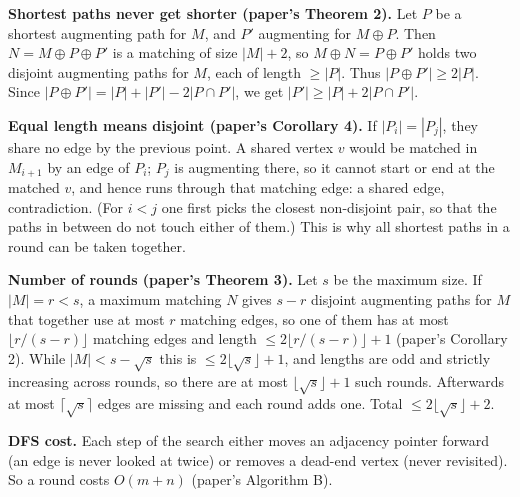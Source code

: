 \documentclass[11pt,a4paper]{article}
\begin{document}
\textbf{Shortest paths never get shorter (paper's Theorem 2).} Let $P$ be a shortest augmenting path for $M$, and $P'$ augmenting for $M\oplus P$. Then $N=M\oplus P\oplus P'$ is a matching of size $|M|+2$, so $M\oplus N=P\oplus P'$ holds two disjoint augmenting paths for $M$, each of length $\ge|P|$. Thus $|P\oplus P'|\ge2|P|$. Since $|P\oplus P'|=|P|+|P'|-2|P\cap P'|$, we get $|P'|\ge|P|+2|P\cap P'|$.

\textbf{Equal length means disjoint (paper's Corollary 4).} If $|P_i|=|P_j|$, they share no edge by the previous point. A shared vertex $v$ would be matched in $M_{i+1}$ by an edge of $P_i$; $P_j$ is augmenting there, so it cannot start or end at the matched $v$, and hence runs through that matching edge: a shared edge, contradiction. (For $i<j$ one first picks the closest non-disjoint pair, so that the paths in between do not touch either of them.) This is why all shortest paths in a round can be taken together.

\textbf{Number of rounds (paper's Theorem 3).} Let $s$ be the maximum size. If $|M|=r<s$, a maximum matching $N$ gives $s-r$ disjoint augmenting paths for $M$ that together use at most $r$ matching edges, so one of them has at most $\lfloor r/(s-r)\rfloor$ matching edges and length $\le2\lfloor r/(s-r)\rfloor+1$ (paper's Corollary 2). While $|M|<s-\sqrt s$ this is $\le2\lfloor\sqrt s\rfloor+1$, and lengths are odd and strictly increasing across rounds, so there are at most $\lfloor\sqrt s\rfloor+1$ such rounds. Afterwards at most $\lceil\sqrt s\rceil$ edges are missing and each round adds one. Total $\le2\lfloor\sqrt s\rfloor+2$.

\textbf{DFS cost.} Each step of the search either moves an adjacency pointer forward (an edge is never looked at twice) or removes a dead-end vertex (never revisited). So a round costs $O(m+n)$ (paper's Algorithm B).
\end{document}
